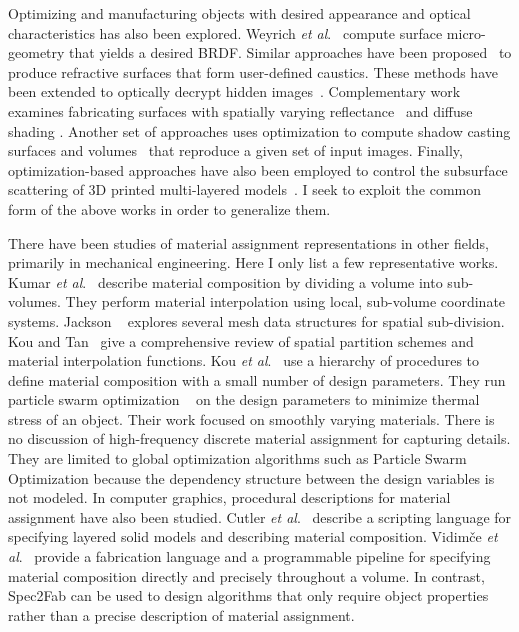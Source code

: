 Optimizing and manufacturing objects with desired appearance and optical characteristics has also been explored. Weyrich \textit{et al}.~ compute surface micro-geometry that yields a desired BRDF. Similar approaches have been proposed~\cite{Finckh:2010,Marios:2011} to produce refractive surfaces that form user-defined caustics. These methods have been extended to optically decrypt hidden images~\cite{Papas:2012}. Complementary work examines fabricating surfaces with spatially varying reflectance~\cite{Matusik:2009:PSR,Malzbender:2012:PRF} and diffuse shading \cite{Alexa:2010:RAI}. Another set of approaches uses optimization to compute shadow casting surfaces and volumes~\cite{Mitra:2009:SA,Bermano:2012,Baran:2012:MLA} that reproduce a given set of input images. Finally, optimization-based approaches have also been employed to control the subsurface scattering of 3D printed multi-layered models~\cite{Dong:2010:FSS,Hasan:2010:PRO}. I seek to exploit the common form of the above works in order to generalize them. 

There have been studies of material assignment representations in other fields, primarily in mechanical engineering. 
Here I only list a few representative works.
Kumar \textit{et al}.~ describe material composition by dividing a volume into sub-volumes.
They perform material interpolation  using local, sub-volume coordinate systems. 
Jackson ~ explores several mesh data structures for spatial sub-division.
Kou and Tan~ give a comprehensive review
of spatial partition schemes and material interpolation functions. 
Kou \textit{et al}.~ use a hierarchy of procedures to define material composition with a small number of design parameters.
They run particle swarm optimization ~\cite{kennedy1995}
on the design parameters to minimize thermal stress of an object.
Their work focused on smoothly varying materials.
There is no discussion of high-frequency discrete material assignment for capturing details.
They are limited to global optimization algorithms
such as Particle Swarm Optimization because the dependency structure between the design variables is not modeled.
In computer graphics, procedural descriptions for material assignment have also been studied.
Cutler \textit{et al}.~ describe a scripting language for specifying layered solid models and describing material composition.
Vidim\v{c}e \textit{et al}.~ provide a fabrication language and a programmable pipeline for specifying material composition directly and precisely throughout a volume.
In contrast, Spec2Fab can be used to design algorithms that only require object properties
rather than a precise description of material assignment.


